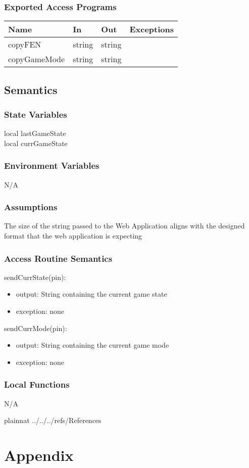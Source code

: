 \documentclass[12pt, titlepage]{article}
\begin{document}
    \subsubsection{Exported Access Programs}
        \begin{center}
        \begin{tabular}{p{4cm} p{3cm} p{3cm} p{2.5cm}}
        \hline
        \textbf{Name} & \textbf{In} & \textbf{Out} & \textbf{Exceptions} \\
        \hline
        copyFEN & string & string & \\
        copyGameMode & string & string & \\
        \hline
        \end{tabular}
        \end{center}

    \subsection{Semantics}
    \subsubsection{State Variables}
    local lastGameState \\
    local currGameState 

    \subsubsection{Environment Variables}
    N/A

    \subsubsection{Assumptions}
    The size of the string passed to the Web Application aligns with the designed format that 
    the web application is expecting \\

    \subsubsection{Access Routine Semantics}
        \noindent sendCurrState(pin):
        \begin{itemize}
            \item output: String containing the current game state
            \item exception: none
        \end{itemize}
        \noindent sendCurrMode(pin):
        \begin{itemize}
            \item output: String containing the current game mode
            \item exception: none
        \end{itemize}

    \subsubsection{Local Functions}
    N/A

\newpage
\newpage

 {plainnat}
 {../../../refs/References}

\newpage

\section{Appendix} \label{Appendix}

\end{document}
